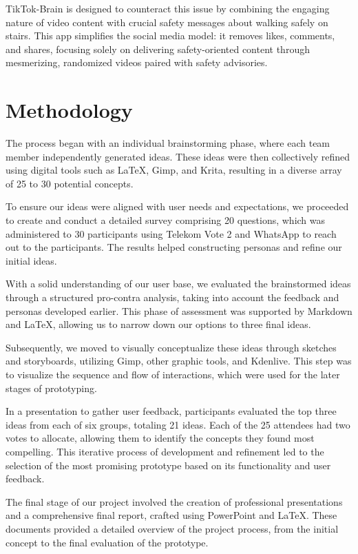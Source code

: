 \documentclass{article}
\begin{document}
TikTok-Brain is designed to counteract this issue by combining the engaging nature of video content
with crucial safety messages about walking safely on stairs.
This app simplifies the social media model: it removes likes, comments, and shares,
focusing solely on delivering safety-oriented content through mesmerizing, randomized videos paired with safety advisories.

\section{Methodology}
The process began with an individual brainstorming phase,
where each team member independently generated ideas.
These ideas were then collectively refined using digital tools such as LaTeX, Gimp, and Krita,
resulting in a diverse array of 25 to 30 potential concepts.

To ensure our ideas were aligned with user needs and expectations,
we proceeded to create and conduct a detailed survey comprising 20 questions,
which was administered to 30 participants using Telekom Vote 2 and WhatsApp to reach out to the participants.
The results helped constructing personas and refine our initial ideas.

With a solid understanding of our user base,
we evaluated the brainstormed ideas through a structured pro-contra analysis,
taking into account the feedback and personas developed earlier.
This phase of assessment was supported by Markdown and LaTeX,
allowing us to narrow down our options to three final ideas.

Subsequently, we moved to visually conceptualize these ideas through sketches and storyboards,
utilizing Gimp, other graphic tools, and Kdenlive.
This step was to visualize the sequence and flow of interactions,
which were used for the later stages of prototyping.

In a presentation to gather user feedback,
participants evaluated the top three ideas from each of six groups, totaling 21 ideas.
Each of the 25 attendees had two votes to allocate,
allowing them to identify the concepts they found most compelling.
This iterative process of development and refinement led to the selection
of the most promising prototype based on its functionality and user feedback.

The final stage of our project involved the creation of professional presentations and a comprehensive final report,
crafted using PowerPoint and LaTeX. These documents provided a detailed overview of the project process,
from the initial concept to the final evaluation of the prototype.
\end{document}
